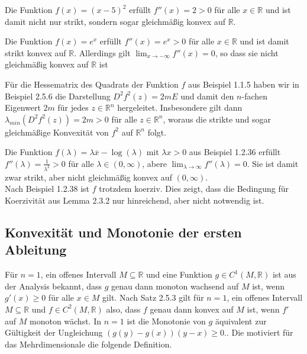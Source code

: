 \documentclass[12pt]{extreport} %
\newcommand{\R}{\mathbb{R}}
\theoremstyle{named}
\theoremstyle{nnamed}
\theoremstyle{itshape}
\theoremstyle{normal}
\begin{document}
\begin{beispiel}[2.5.11]
	Die Funktion $f(x) = (x - 5)^2 $ erfüllt $f''(x) = 2 > 0$ für alle $x \in \R$ und ist damit nicht nur strikt, sondern sogar gleichmäßig konvex auf $\R$.	
\end{beispiel}

\begin{beispiel}[2.5.12]
Die Funktion $f(x) = e^x$ erfüllt $f''(x) = e^x > 0$ für alle $x \in \R$ und ist damit strikt konvex auf $\R$. Allerdings gilt $\lim_{x \rightarrow -\infty} f''(x) = 0$, so dass sie nicht gleichmäßig konvex auf $\R$ ist
\end{beispiel}

\begin{beispiel}
	Für die Hessematrix des Quadrats der Funktion $f$ aus Beispiel 1.1.5 haben wir in Beispiel 2.5.6 die Darstellung $D^2 f^2(z) = 2mE$ und damit den $n$-fachen Eigenwert $2m$ für jedes $z \in \R^n$ hergeleitet. Insbesondere gilt dann $\lambda_{min}(D^2 f^2(z)) = 2m > 0$ für alle $z \in \R^n$, woraus die strikte und sogar gleichmäßige Konvexität von $f^2$ auf $\R^n$ folgt. 
\end{beispiel}

\begin{beispiel}
	Die Funktion $f(\lambda) = \lambda \overline{x} - \log(\lambda)$ mit $\lambda{x} > 0$ aus Beispiel 1.2.36 erfüllt $f''(\lambda) = \frac{1}{\lambda^2} > 0$ für alle $\lambda \in (0, \infty)$, abere $\lim_{\lambda \rightarrow \infty} f''(\lambda) = 0$. Sie ist damit zwar strikt, aber nicht gleichmäßig konvex auf $(0, \infty)$. ~\\
	
	Nach Beispiel 1.2.38 ist $f$ trotzdem koerziv. Dies zeigt, dass die Bedingung für Koerzivität aus Lemma 2.3.2 nur hinreichend, aber nicht notwendig ist.
\end{beispiel}

\subsection*{Konvexität und Monotonie der ersten Ableitung}

Für $n = 1$, ein offenes Intervall $M \subseteq \R$ und eine Funktion $g \in C^1(M, \R)$ ist aus der Analysis bekannt, dass $g$ genau dann monoton wachsend auf $M$ ist, wenn $g'(x) \geq 0$ für alle $x \in M$ gilt. Nach Satz 2.5.3 gilt für $n = 1$, ein offenes Intervall $M \subseteq \R$ und $f \in C^2(M, \R)$ also, dass $f$ genau dann konvex auf $M$ ist, wenn $f'$ auf $M$ monoton wächst.  In $n = 1$ ist die Monotonie von $g$ äquivalent zur Gültigkeit der Ungleichung $(g(y) - g(x))(y - x) \geq 0$.. Die motiviert für das Mehrdimensionale die folgende Definition.
\end{document}
